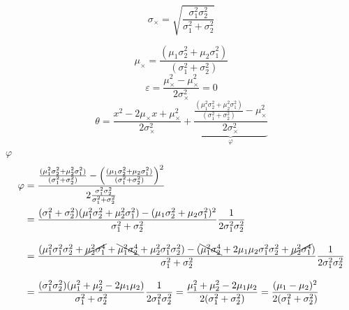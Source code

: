 \documentclass[a4paper,11pt]{book}
\theoremstyle{definition}
\newif\ifen
\newif\ifes
\newcommand{\en}[1]{\ifen#1\fi}
\newcommand{\es}[1]{\ifes#1\fi}
\begin{document}
\es{Esta ecuación es cuadrática en x, y por lo tanto es proporcional a una función de densidad gausiana con desvío}
\begin{equation}
\sigma_{\times} = \sqrt{\frac{\sigma_1^2\sigma_2^2}{\sigma_1^2+\sigma_2^2}}
\end{equation}
%
\en{and mean}
\es{y media}
\begin{equation}
 \mu_{\times} = \frac{(\mu_1\sigma_2^2 + \mu_2\sigma_1^2)}{(\sigma_1^2 + \sigma_2^2) }
\end{equation}
%
\en{Since a term $\varepsilon = 0$ can be added to complete the square in $\theta$, this proof is sufficient when no normalization is needed. }%
\es{Dado que un término $\varepsilon = 0$ puede ser agregado para completar el cuadrado en $\theta$, esta prueba es suficiente cuando no se necesita una normalización. }%
%
\begin{equation}
 \varepsilon = \frac{\mu_{\times}^2-\mu_{\times}^2}{2\sigma_{\times}^2} = 0
\end{equation}
%
\en{By adding this term to $\theta$ we obtain}
\begin{equation}
 \theta = \frac{x^2 - 2\mu_{\times}x + \mu_{\times}^2 }{2\sigma_{\times}^2} + \underbrace{\frac{ \frac{(\mu_1^2\sigma_2^2 + \mu_2^2\sigma_1^2)}{(\sigma_1^2 + \sigma_2^2) } - \mu_{\times}^2}{2\sigma_{\times}^2}}_{\varphi}
\end{equation}
%
\en{Reorganizing} $\varphi$
\begin{equation}
\begin{split}
\varphi & = \frac{\frac{(\mu_1^2\sigma_2^2 + \mu_2^2\sigma_1^2)}{(\sigma_1^2 + \sigma_2^2) } - \left(\frac{(\mu_1\sigma_2^2 + \mu_2\sigma_1^2)}{(\sigma_1^2 + \sigma_2^2) }\right)^2 }{2\frac{\sigma_1^2\sigma_2^2}{\sigma_1^2+\sigma_2^2}}  \\
& = \frac{(\sigma_1^2 + \sigma_2^2)(\mu_1^2\sigma_2^2 + \mu_2^2\sigma_1^2) - (\mu_1\sigma_2^2 + \mu_2\sigma_1^2)^2}{\sigma_1^2 + \sigma_2^2}\frac{1}{2\sigma_1^2\sigma_2^2} \\[0.3cm]
& = \frac{(\mu_1^2\sigma_1^2\sigma_2^2 + \cancel{\mu_2^2\sigma_1^4} + \bcancel{\mu_1^2\sigma_2^4} + \mu_2^2\sigma_1^2\sigma_2^2) - (\bcancel{\mu_1^2\sigma_2^4} + 2\mu_1\mu_2\sigma_1^2\sigma_2^2 + \cancel{\mu_2^2\sigma_1^4} )}{\sigma_1^2 + \sigma_2^2}  \frac{1}{2\sigma_1^2\sigma_2^2} \\[0.3cm]
& = \frac{(\sigma_1^2\sigma_2^2)(\mu_1^2 + \mu_2^2 - 2\mu_1\mu_2)}{\sigma_1^2 + \sigma_2^2}\frac{1}{2\sigma_1^2\sigma_2^2} = \frac{\mu_1^2 + \mu_2^2 - 2\mu_1\mu_2}{2(\sigma_1^2 + \sigma_2^2)} = \frac{(\mu_1 - \mu_2)^2}{2(\sigma_1^2 + \sigma_2^2)}
\end{split}
\end{equation}
\end{document}
